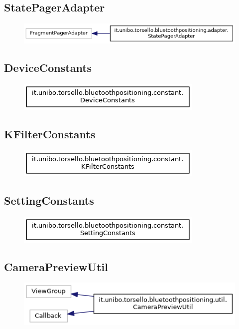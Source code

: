 \newpage
\subsection{StatePagerAdapter}
\begin{figure}[ph]
	\centering
	\includegraphics[scale=.55]{img/uml/inherit_graph/inherit_graph_3.png}
	\caption[]{}
\end{figure}

\newpage
\subsection{DeviceConstants}
\begin{figure}[ph]
	\centering
	\includegraphics[scale=.55]{img/uml/inherit_graph/inherit_graph_5.png}
	\caption[]{}
\end{figure}

\newpage
\subsection{KFilterConstants}
\begin{figure}[ph]
	\centering
	\includegraphics[scale=.55]{img/uml/inherit_graph/inherit_graph_6.png}
	\caption[]{}
\end{figure}

\newpage
\subsection{SettingConstants}
\begin{figure}[ph]
	\centering
	\includegraphics[scale=.55]{img/uml/inherit_graph/inherit_graph_7.png}
	\caption[]{}
\end{figure}

\newpage
\subsection{CameraPreviewUtil}
\begin{figure}[ph]
	\centering
	\includegraphics[scale=.55]{img/uml/inherit_graph/inherit_graph_16.png}
	\caption[]{}
\end{figure}


